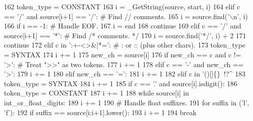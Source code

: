 \begin{DoxyCode}
162                 token\_type = CONSTANT
163                 i = \_GetString(source, start, i)
164         \textcolor{keywordflow}{elif} c == \textcolor{stringliteral}{'/'} \textcolor{keywordflow}{and} source[i+1] == \textcolor{stringliteral}{'/'}:    \textcolor{comment}{# Find // comments.}
165             i = source.find(\textcolor{stringliteral}{'\(\backslash\)n'}, i)
166             \textcolor{keywordflow}{if} i == -1:  \textcolor{comment}{# Handle EOF.}
167                 i = end
168             \textcolor{keywordflow}{continue}
169         \textcolor{keywordflow}{elif} c == \textcolor{stringliteral}{'/'} \textcolor{keywordflow}{and} source[i+1] == \textcolor{stringliteral}{'*'}:    \textcolor{comment}{# Find /* comments. */}
170             i = source.find(\textcolor{stringliteral}{'*/'}, i) + 2
171             \textcolor{keywordflow}{continue}
172         \textcolor{keywordflow}{elif} c \textcolor{keywordflow}{in} \textcolor{stringliteral}{':+-<>&|*='}:                   \textcolor{comment}{# : or :: (plus other chars).}
173             token\_type = SYNTAX
174             i += 1
175             new\_ch = source[i]
176             \textcolor{keywordflow}{if} new\_ch == c \textcolor{keywordflow}{and} c != \textcolor{stringliteral}{'>'}:         \textcolor{comment}{# Treat ">>" as two tokens.}
177                 i += 1
178             \textcolor{keywordflow}{elif} c == \textcolor{stringliteral}{'-'} \textcolor{keywordflow}{and} new\_ch == \textcolor{stringliteral}{'>'}:
179                 i += 1
180             \textcolor{keywordflow}{elif} new\_ch == \textcolor{stringliteral}{'='}:
181                 i += 1
182         \textcolor{keywordflow}{elif} c \textcolor{keywordflow}{in} \textcolor{stringliteral}{'()[]\{\}~!?^%
183             token\_type = SYNTAX
184             i += 1
185             \textcolor{keywordflow}{if} c == \textcolor{stringliteral}{'.'} \textcolor{keywordflow}{and} source[i].isdigit():
186                 token\_type = CONSTANT
187                 i += 1
188                 \textcolor{keywordflow}{while} source[i] \textcolor{keywordflow}{in} int\_or\_float\_digits:
189                     i += 1
190                 \textcolor{comment}{# Handle float suffixes.}
191                 \textcolor{keywordflow}{for} suffix \textcolor{keywordflow}{in} (\textcolor{stringliteral}{'l'}, \textcolor{stringliteral}{'f'}):
192                     \textcolor{keywordflow}{if} suffix == source[i:i+1].lower():
193                         i += 1
194                         \textcolor{keywordflow}{break}
}
\end{DoxyCode}
